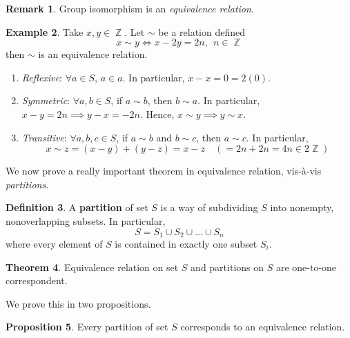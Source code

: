 \documentclass[11pt]{amsart} %
\theoremstyle{definition}
\newtheorem{definition}{Definition}[section]
\newtheorem{proposition}[definition]{Proposition}
\newtheorem{theorem}[definition]{Theorem}
\newtheorem{example}[definition]{Example}
\theoremstyle{definition}
\newtheorem{remark}[definition]{Remark}
\DeclareMathOperator{\Z}{\mathbb{Z}}
\numberwithin{equation}{section}
\begin{document}
\begin{remark}
	Group isomorphism is an \textit{equivalence relation}.
\end{remark}

\begin{example}
	Take $x,y \in \Z$. Let $\sim $ be a relation defined
	$$ x \sim y \iff x-2y = 2n, \: \: n \in \Z $$
	then $\sim $ is an equivalence relation.
	\begin{enumerate}[noitemsep]
	\item \textit{Reflexive}: $\forall a \in S$, $a \in a$. In particular, $x - x = 0 = 2(0)$.
	\item \textit{Symmetric}: $\forall a,b \in S$, if $a \sim b$, then $b \sim a$. In particular, $x - y = 2n \implies y - x = -2n$. Hence, $x \sim y \implies y \sim x$.
	\item \textit{Transitive}: $\forall a,b,c \in S$, if $a \sim b$ and $b \sim c$, then $a \sim c$. In particular,
	$$ x \sim z = (x - y) + (y - z) = x -z \quad (= 2n + 2n = 4n \in 2\Z)  $$
	\end{enumerate}	
\end{example}

We now prove a really important theorem in equivalence relation, vis-\`a-vis \textit{partitions}.

\begin{definition}
	A \textbf{partition} of set $S$ is a way of subdividing $S$ into nonempty, nonoverlapping subsets. In particular,
	$$S = S_1 \cup S_2 \cup \dots \cup S_n$$
	where every element of $S$ is contained in exactly one subset $S_i$.
\end{definition}

\begin{theorem}
	Equivalence relation on set $S$ and partitions on $S$ are one-to-one correspondent.
\end{theorem}

We prove this in two propositions.

\begin{proposition}
	Every partition of set $S$ corresponds to an equivalence relation.
\end{proposition}
\end{document}
